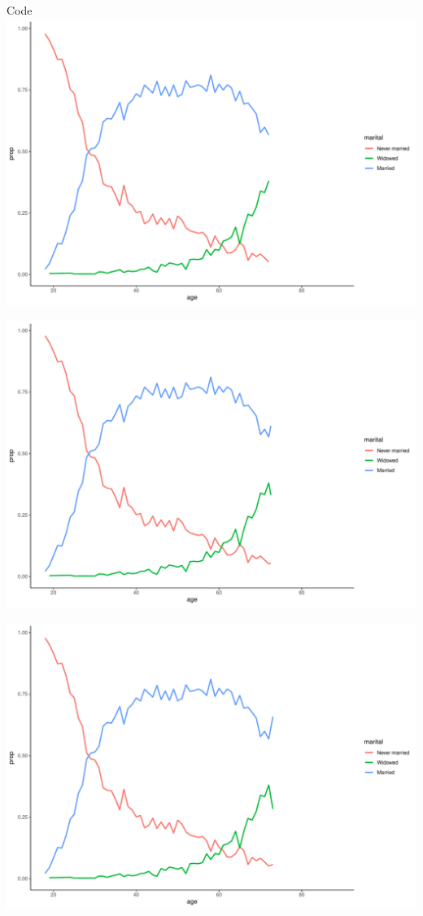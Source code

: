 \documentclass[
  ignorenonframetext,
]{beamer}
\begin{document}
\begin{frame}[fragile]{Code}
\includegraphics{gss_cat_files/figure-beamer/unnamed-chunk-1-80.pdf}

\includegraphics{gss_cat_files/figure-beamer/unnamed-chunk-1-81.pdf}

\includegraphics{gss_cat_files/figure-beamer/unnamed-chunk-1-82.pdf}


\end{frame}
\end{document}
